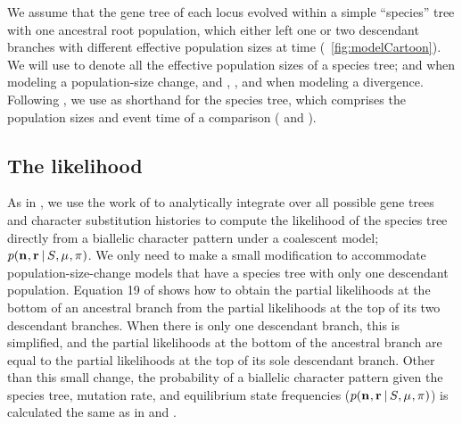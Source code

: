 We assume that the gene tree of each locus evolved within a simple
``species'' tree with one ancestral root population, which either
left one or two descendant branches with different effective population sizes
at time \comparisonetime
(\fig{}~\ref{fig:modelCartoon}).
We will use
\comparisonpopsizes{}
to denote all the effective population sizes of a species tree;
\epopsize[\rootpopindex] and 
\epopsize[\descendantpopindex{1}] when modeling a population-size change, and
\epopsize[\rootpopindex],
\epopsize[\descendantpopindex{1}],
and \epopsize[\descendantpopindex{2}] when modeling a divergence.
Following \citet{Oaks2018ecoevolity}, we use
\sptree{}
as shorthand for the species tree, which comprises the population sizes and
event time of a comparison
(\comparisonpopsizes{} and \comparisonetime{}).


\subsection{The likelihood}

As in \citet{Oaks2018ecoevolity},
we use the work of \citet{Bryant2012}
to analytically integrate over all possible gene trees and
character substitution histories to compute the likelihood
of the species tree directly from 
a biallelic character pattern under a coalescent model;
$p(\mathbf{n}_{}, \mathbf{r}_{} \,|\, S_{}, \mu_{}, \pi_{})$.
We only need to make a small modification to accommodate population-size-change
models that have a species tree with only one descendant population.
Equation 19 of \citet{Bryant2012} shows how to obtain the partial likelihoods
at the bottom of an ancestral branch from the partial likelihoods at the top of
its two descendant branches.
When there is only one descendant branch, this is simplified, and the partial
likelihoods at the bottom of the ancestral branch are equal to the partial
likelihoods at the top of its sole descendant branch.
Other than this small change, the probability of a biallelic character pattern
given the species tree, mutation rate, and equilibrium state frequencies
($p(\mathbf{n}_{}, \mathbf{r}_{} \,|\, S_{}, \mu_{}, \pi_{})$)
is calculated the same as in \citet{Bryant2012} and \citet{Oaks2018ecoevolity}.



